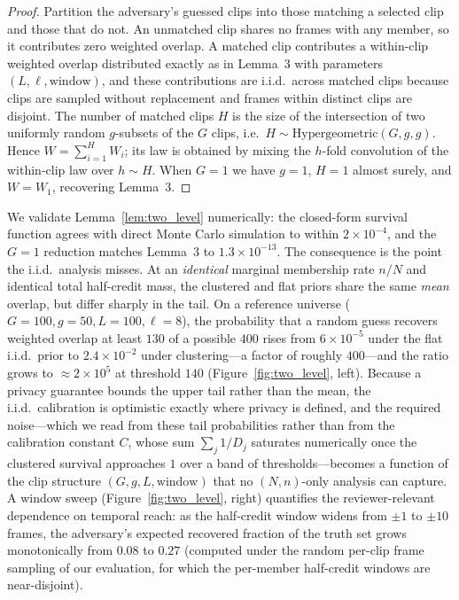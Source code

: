 \documentclass[sigconf,anonymous, review]{acmart}
\begin{document}
\begin{proof}
Partition the adversary's guessed clips into those matching a selected clip and those that do not. An unmatched clip shares no frames with any member, so it contributes zero weighted overlap. A matched clip contributes a within-clip weighted overlap distributed exactly as in Lemma~3 with parameters $(L,\ell,\text{window})$, and these contributions are i.i.d.\ across matched clips because clips are sampled without replacement and frames within distinct clips are disjoint. The number of matched clips $H$ is the size of the intersection of two uniformly random $g$-subsets of the $G$ clips, i.e.\ $H \sim \mathrm{Hypergeometric}(G,g,g)$. Hence $W = \sum_{i=1}^{H} W_i$; its law is obtained by mixing the $h$-fold convolution of the within-clip law over $h \sim H$. When $G=1$ we have $g=1$, $H=1$ almost surely, and $W = W_1$, recovering Lemma~3.
\end{proof}

We validate Lemma~\ref{lem:two_level} numerically: the closed-form survival function agrees with direct Monte Carlo simulation to within $2\times10^{-4}$, and the $G=1$ reduction matches Lemma~3 to $1.3\times10^{-13}$. The consequence is the point the i.i.d.\ analysis misses. At an \emph{identical} marginal membership rate $n/N$ and identical total half-credit mass, the clustered and flat priors share the same \emph{mean} overlap, but differ sharply in the tail. On a reference universe ($G=100, g=50, L=100, \ell=8$), the probability that a random guess recovers weighted overlap at least $130$ of a possible $400$ rises from $6\times10^{-5}$ under the flat i.i.d.\ prior to $2.4\times10^{-2}$ under clustering---a factor of roughly $400$---and the ratio grows to $\approx2\times10^5$ at threshold $140$ (Figure~\ref{fig:two_level}, left). Because a privacy guarantee bounds the upper tail rather than the mean, the i.i.d.\ calibration is optimistic exactly where privacy is defined, and the required noise---which we read from these tail probabilities rather than from the calibration constant $C$, whose sum $\sum_j 1/D_j$ saturates numerically once the clustered survival approaches $1$ over a band of thresholds---becomes a function of the clip structure $(G,g,L,\text{window})$ that no $(N,n)$-only analysis can capture. A window sweep (Figure~\ref{fig:two_level}, right) quantifies the reviewer-relevant dependence on temporal reach: as the half-credit window widens from $\pm1$ to $\pm10$ frames, the adversary's expected recovered fraction of the truth set grows monotonically from $0.08$ to $0.27$ (computed under the random per-clip frame sampling of our evaluation, for which the per-member half-credit windows are near-disjoint).
\end{document}
